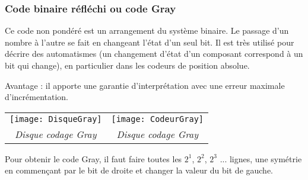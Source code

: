 \subsubsection{Code  binaire réfléchi ou code Gray}
\begin{minipage}[c]{.55\linewidth}
Ce code non pondéré est un arrangement du système binaire. Le passage d'un nombre à l'autre se fait en changeant l'état d'un seul bit. Il est très utilisé pour décrire des automatismes (un changement d'état d'un composant correspond à un bit qui change), en particulier dans les codeurs de position absolue. 

Avantage : il apporte une garantie d'interprétation avec une erreur maximale d'incrémentation. 

\begin{center}
\begin{tabular}{cc}
\texttt{[image: DisqueGray]} &
\texttt{[image: CodeurGray]} \\
\textit{Disque codage Gray} & 
\textit{Disque codage Gray} \\
\end{tabular}



\end{center}

Pour obtenir le code Gray, il faut faire toutes les $2^1$, $2^2$, $2^3$ ... lignes, une symétrie en commençant par le bit de droite et changer la valeur du bit de gauche. 

\end{minipage}\hfill
